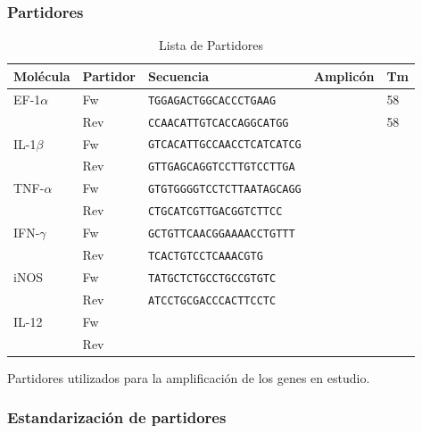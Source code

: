 \documentclass[12pt,a4paper,]{article}
\begin{document}
\subsubsection{Partidores}\label{partidores}

\begin{table}[h!]
\sffamily
  \begin{center}
    \begin{threeparttable}
      \caption{Lista de Partidores}
      \begin{tabularx}{15cm}{l l X l l}
    \toprule
    Molécula & Partidor & Secuencia & Amplicón & Tm \\
    \midrule
    EF-1$\alpha$ & Fw & \texttt{TGGAGACTGGCACCCTGAAG} & & 58 \\
        & Rev & \texttt{CCAACATTGTCACCAGGCATGG} & & 58 \\
    \midrule
    IL-1$\beta$ & Fw & \texttt{GTCACATTGCCAACCTCATCATCG} & & \\
     & Rev & \texttt{GTTGAGCAGGTCCTTGTCCTTGA} & & \\
     \midrule
     TNF-$\alpha$ & Fw & \texttt{GTGTGGGGTCCTCTTAATAGCAGG} & &  \\
     & Rev & \texttt{CTGCATCGTTGACGGTCTTCC} & &  \\
     \midrule
     IFN-$\gamma$ & Fw & \texttt{GCTGTTCAACGGAAAACCTGTTT} & & \\
      & Rev & \texttt{TCACTGTCCTCAAACGTG} & & \\
     \midrule
     iNOS & Fw & \texttt{TATGCTCTGCCTGCCGTGTC} & & \\
      & Rev & \texttt{ATCCTGCGACCCACTTCCTC} & & \\
     \midrule
     IL-12 & Fw & & & \\
       & Rev & & & \\
\bottomrule
\end{tabularx}
\begin{tablenotes}
    \item Partidores utilizados para la amplificación de los genes en estudio.
\end{tablenotes}
\end{threeparttable}
\end{center}
\end{table}

\subsubsection{Estandarización de
partidores}\label{estandarizaciuxf3n-de-partidores}
\end{document}
